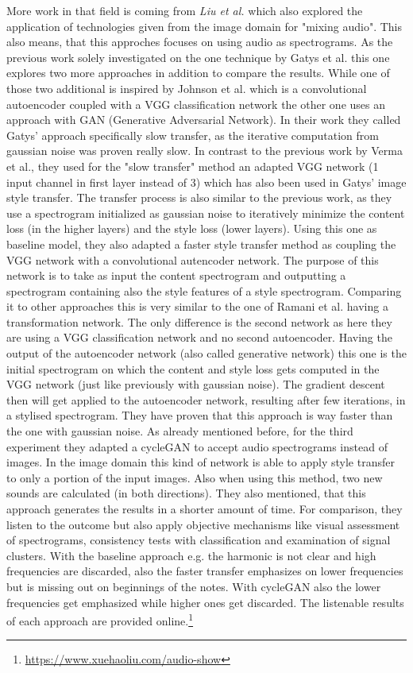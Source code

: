 More work in that field is coming from \textit{Liu et al.} \cite{Liu2019} which also explored the application of technologies given from the image domain for "mixing audio". This also means, that this approches focuses on using audio as spectrograms. As the previous work solely investigated on the one technique by Gatys et al. this one explores two more approaches in addition to compare the results. While one of those two additional is inspired by Johnson et al. which is a convolutional autoencoder coupled with a VGG classification network the other one uses an approach with GAN (Generative Adversarial Network). In their work they called Gatys' approach specifically slow transfer, as the iterative computation from gaussian noise was proven really slow. In contrast to the previous work by Verma et al., they used for the "slow transfer" method an adapted VGG network (1 input channel in first layer instead of 3) which has also been used in Gatys' image style transfer. The transfer process is also similar to the previous work, as they use a spectrogram initialized as gaussian noise to iteratively minimize the content loss (in the higher layers) and the style loss (lower layers). Using this one as baseline model, they also adapted a faster style transfer method as coupling the VGG network with a convolutional autencoder network. The purpose of this network is to take as input the content spectrogram and outputting a spectrogram containing also the style features of a style spectrogram. Comparing it to other approaches this is very similar to the one of Ramani et al. having a transformation network. The only difference is the second network as here they are using a VGG classification network and no second autoencoder. Having the output of the autoencoder network (also called generative network) this one is the initial spectrogram on which the content and style loss gets computed in the VGG network (just like previously with gaussian noise). The gradient descent then will get applied to the autoencoder network, resulting after few iterations, in a stylised spectrogram. They have proven that this approach is way faster than the one with gaussian noise. As already mentioned before, for the third experiment they adapted a cycleGAN to accept audio spectrograms instead of images. In the image domain this kind of network is able to apply style transfer to only a portion of the input images. Also when using this method, two new sounds are calculated (in both directions). They also mentioned, that this approach generates the results in a shorter amount of time. For comparison, they listen to the outcome but also apply objective mechanisms like visual assessment of spectrograms, consistency tests with classification and examination of signal clusters. With the baseline approach e.g. the harmonic is not clear and high frequencies are discarded, also the faster transfer emphasizes on lower frequencies but is missing out on beginnings of the notes. With cycleGAN also the lower frequencies get emphasized while higher ones get discarded. The listenable results of each approach are provided online.\footnote{\url{https://www.xuehaoliu.com/audio-show}}\\


